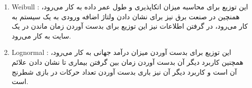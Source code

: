 \begin{enumerate}
    \item Weibull : 
    این توزیع برای محاسبه میزان اتکاپذیری و طول عمر داده به کار می‌رود، همنچین در صنعت برق نیز برای نشان دادن ولتاژ اضافه ورودی به یک سیستم به کار می‌رود، در گرفتن اطلاعات نیز این توزیع برای بدست آوردن زمان ماندن در یک سایت به کار می‌رود.
    \item Lognormal : 
    این توزیع برای بدست آوردن میزان درآمد جهانی به کار می‌رود، همچنین کاربرد دیگر آن بدست آوردن زمان بین گرفتن بیماری تا نشان دادن علائم آن است و کاربرد دیگر آن نیز باری بدست آوردن تعداد حرکات در بازی شطرنج است.
\end{enumerate}